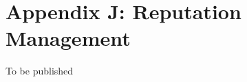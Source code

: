\documentclass[../main.tex]{subfiles}
\begin{document}
\section{Appendix J: Reputation Management}
To be published
\end{document}
